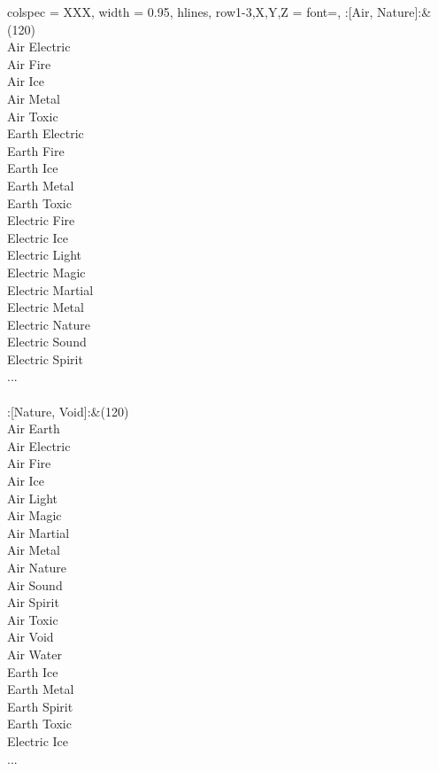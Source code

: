 \begin{longtblr}[
	caption = {2v2 Defending Weak},
	label = {2v2-Defending-Weak},
]{
	colspec = {XXX}, width = 0.95\linewidth,
	hlines,
	row{1-3,X,Y,Z} = {font=\bfseries},
}
	:[Air, Nature]:&{(120)\\
	Air Electric \\
	Air Fire \\
	Air Ice \\
	Air Metal \\
	Air Toxic \\
	Earth Electric \\
	Earth Fire \\
	Earth Ice \\
	Earth Metal \\
	Earth Toxic \\
	Electric Fire \\
	Electric Ice \\
	Electric Light \\
	Electric Magic \\
	Electric Martial \\
	Electric Metal \\
	Electric Nature \\
	Electric Sound \\
	Electric Spirit \\
	...\\
	}\\

	:[Nature, Void]:&{(120)\\
	Air Earth \\
	Air Electric \\
	Air Fire \\
	Air Ice \\
	Air Light \\
	Air Magic \\
	Air Martial \\
	Air Metal \\
	Air Nature \\
	Air Sound \\
	Air Spirit \\
	Air Toxic \\
	Air Void \\
	Air Water \\
	Earth Ice \\
	Earth Metal \\
	Earth Spirit \\
	Earth Toxic \\
	Electric Ice \\
	...\\
	}\\


\end{longtblr}

